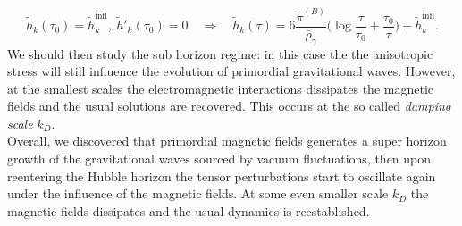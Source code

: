 {$$\tilde h_k(\tau_0)=\tilde h_k^\text{infl},\ \tilde h'_k(\tau_0)=0 \quad \Rightarrow\quad \tilde h_k(\tau) = 6 \frac{\tilde\pi^{(B)}}{\bar\rho_\gamma}\bigg(\log\frac{\tau}{\tau_0}+\frac{\tau_0}{\tau}\bigg)+\tilde h_k^\text{infl}.$$
We should then study the sub horizon regime: in this case the the anisotropic stress will still influence the evolution of primordial gravitational waves. However, at the smallest scales the electromagnetic interactions dissipates the magnetic fields and the usual solutions are recovered. This occurs at the so called \emph{damping scale} $k_D$.\\Overall, we discovered that primordial magnetic fields generates a super horizon growth of the gravitational waves sourced by vacuum fluctuations, then upon reentering the Hubble horizon the tensor perturbations start to oscillate again under the influence of the magnetic fields. At some even smaller scale $k_D$ the magnetic fields dissipates and the usual dynamics is reestablished.  

}
